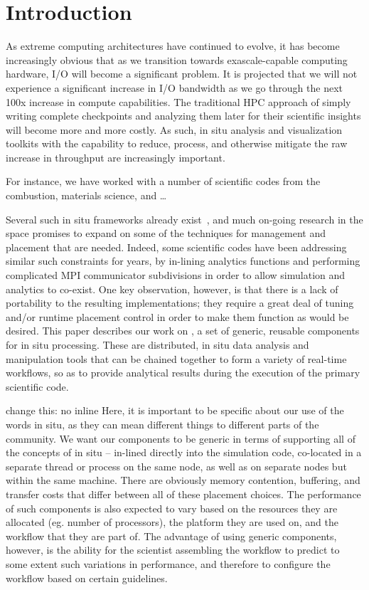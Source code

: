 \section{Introduction}
\label{s:intro}
As extreme computing architectures have continued to evolve, it has become increasingly obvious that as we transition towards exascale-capable computing hardware, I/O will become a significant problem.  It is projected that we will not experience a significant increase in I/O bandwidth as we go through the next 100x increase in compute capabilities.  The traditional HPC approach of simply writing complete checkpoints and analyzing them later for their scientific insights will become more and more costly.  As such, in situ analysis and visualization toolkits with the capability to reduce, process, and otherwise mitigate the raw increase in throughput are increasingly important.  

For instance, we have worked with a number of scientific codes from the combustion, materials science, and \ldots

Several such in situ frameworks already exist~\cite{Catalyst,libSim,Glean,Flexpath}, and much on-going research in the space promises to expand on some of the techniques for management and placement that are needed.  Indeed, some scientific codes have been addressing similar such constraints for years, by in-lining analytics functions and performing complicated MPI communicator subdivisions in order to allow simulation and analytics to co-exist.  One key observation, however, is that there is a lack of portability to the resulting implementations; they require a great deal of tuning and/or runtime placement control in order to make them function as would be desired.  This paper describes our work on \sys, a set of generic, reusable components for in situ processing. These are distributed, in situ data analysis and manipulation tools that can be chained together to form a variety of real-time workflows, so as to provide analytical results during the execution of the primary scientific code.

change this: no inline
Here, it is important to be specific about our use of the words in situ, as they can mean different things to different parts of the community.  We want our components to be generic in terms of supporting all of the concepts of in situ -- in-lined directly into the simulation code, co-located in a separate thread or process on the same node, as well as on separate nodes but within the same machine.  There are obviously memory contention, buffering, and transfer costs that differ between all of these placement choices. The performance of such components is also expected to vary based on the resources they are allocated (eg. number of processors), the platform they are used on, and the workflow that they are part of. The advantage of using generic components, however, is the ability for the scientist assembling the workflow to predict to some extent such variations in performance, and therefore to configure the workflow based on certain guidelines. 

